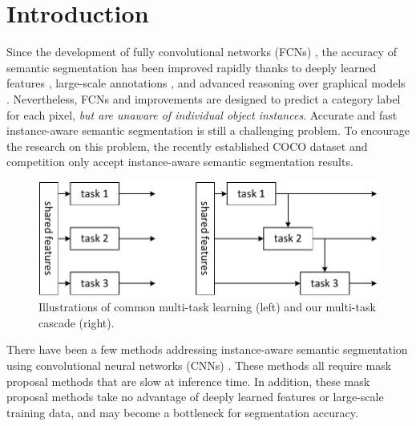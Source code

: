 \documentclass[10pt,twocolumn,letterpaper]{article}
\begin{document}

\section{Introduction}

Since the development of fully convolutional networks (FCNs) \cite{Long2015}, the accuracy of semantic segmentation has been improved rapidly \cite{Chen2015,Papandreou2015,Dai2015a,Zheng2015} thanks to deeply learned features \cite{Krizhevsky2012,Simonyan2015}, large-scale annotations \cite{Lin2014}, and advanced reasoning over graphical models \cite{Chen2015,Zheng2015}. Nevertheless, FCNs \cite{Long2015} and improvements \cite{Chen2015,Papandreou2015,Dai2015a,Zheng2015} are designed to predict a category label for each pixel, \emph{but are unaware of individual object instances}.
Accurate and fast instance-aware semantic segmentation is still a challenging problem.
To encourage the research on this problem, the recently established COCO \cite{Lin2014} dataset and competition only accept instance-aware semantic segmentation results.

\begin{figure}[t]
\centering
\includegraphics[width=0.9\linewidth]{figure/illustration}
\caption{Illustrations of common multi-task learning (left) and our multi-task cascade (right).}
\label{fig:illustration}
\vspace{-1em}
\end{figure}

There have been a few methods \cite{Girshick2014,Hariharan2014,Dai2015,Hariharan2015} addressing instance-aware semantic segmentation using convolutional neural networks (CNNs) \cite{LeCun1989,Krizhevsky2012}.
These methods all require mask proposal methods \cite{Uijlings2013,Carreira2012a,Arbelaez2014} that are slow at inference time. In addition, these mask proposal methods take no advantage of deeply learned features or large-scale training data, and may become a bottleneck for segmentation accuracy.
\end{document}
